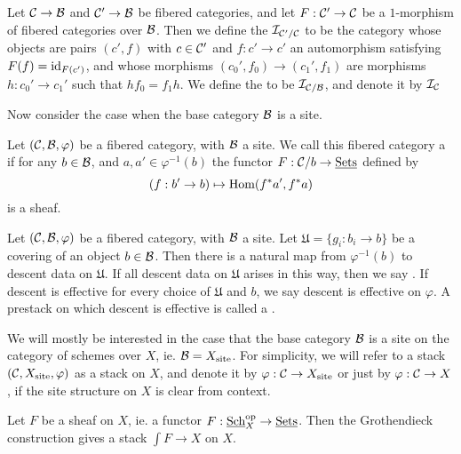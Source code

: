 \begin{defn}
Let $\mathcal{C}\rightarrow\mathcal{B}$ and $\mathcal{C}'\rightarrow\mathcal{B}$ be fibered categories, and let $F:\mathcal{C}'\rightarrow\mathcal{C}$ be a $1$-morphism of fibered categories over $\mathcal{B}$.  Then we define the  $\mathcal{I}_{\mathcal{C}'/\mathcal{C}}$ to be the category whose objects are pairs $(c',f)$ with $c\in \mathcal{C}'$ and $f:c'\rightarrow c'$ an automorphism satisfying $F(f) = \textnormal{id}_{F(c')}$, and whose morphisms $(c_0',f_0)\rightarrow (c_1',f_1)$ are morphisms $h: c_0'\rightarrow c_1'$ such that $hf_0 = f_1h$.  We define the  to be $\mathcal{I}_{\mathcal{C}/\mathcal{B}}$, and denote it by $\mathcal{I}_{\mathcal{C}}$
\end{defn}

Now consider the case when the base category $\mathcal{B}$ is a site.
\begin{defn}
Let $(\mathcal{C},\mathcal{B},\varphi)$ be a fibered category, with $\mathcal{B}$ a site.  We call this fibered category a  if for any $b\in\mathcal{B}$, and $a,a'\in\varphi^{-1}(b)$ the functor $F:\mathcal{C}/b\rightarrow\textnormal{\underline{Sets}}$ defined by
$$(f:b'\rightarrow b)\mapsto \textnormal{Hom}(f^*a',f^*a)$$
is a sheaf.
\end{defn}

\begin{defn}
Let $(\mathcal{C},\mathcal{B},\varphi)$ be a fibered category, with $\mathcal{B}$ a site.  Let $\mathfrak U = \{g_i: b_i\rightarrow b\}$ be a covering of an object $b\in\mathcal{B}$.  Then there is a natural map from $\varphi^{-1}(b)$ to descent data on $\mathfrak U$.  If all descent data on $\mathfrak U$ arises in this way, then we say .  If descent is effective for every choice of $\mathfrak U$ and $b$, we say descent is effective on $\varphi$.  A prestack on which descent is effective is called a .
\end{defn}

We will mostly be interested in the case that the base category $\mathcal{B}$ is a site on the category of schemes over $X$, ie. $\mathcal{B} = X_{\text{site}}$.  For simplicity, we will refer to a stack $(\mathcal{C},X_{\text{site}},\varphi)$ as a stack on $X$, and denote it by $\varphi: \mathcal{C}\rightarrow X_{\text{site}}$ or just by $\varphi:\mathcal{C}\rightarrow X$, if the site structure on $X$ is clear from context.

\begin{ex}
Let $F$ be a sheaf on $X$, ie. a functor $F:\textnormal{\underline{Sch}}_X^{\text{op}}\rightarrow\textnormal{\underline{Sets}}$.  Then the Grothendieck construction gives a stack $\int F\rightarrow X$ on $X$.
\end{ex}

